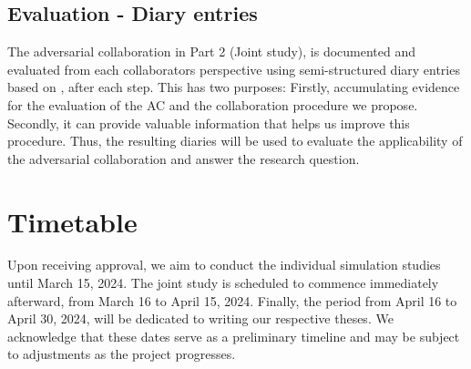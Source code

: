 \documentclass[man]{apa7}
\begin{document}
\subsection{Evaluation - Diary entries}
The adversarial collaboration in Part 2 (Joint study), is documented and evaluated from each collaborators perspective using semi-structured diary entries based on \textcite{shah_exploring_2016}, after each step. This has two purposes: Firstly, accumulating evidence for the evaluation of the AC and the collaboration procedure we propose. Secondly, it can provide valuable information that helps us improve this procedure. Thus, the resulting diaries will be used to evaluate the applicability of the adversarial collaboration and answer the research question.

\section{Timetable}
Upon receiving approval, we aim to conduct the individual simulation studies until March 15, 2024. The joint study is scheduled to commence immediately afterward, from March 16 to April 15, 2024. Finally, the period from April 16 to April 30, 2024, will be dedicated to writing our respective theses. We acknowledge that these dates serve as a preliminary timeline and may be subject to adjustments as the project progresses.
\printbibliography
\end{document}
